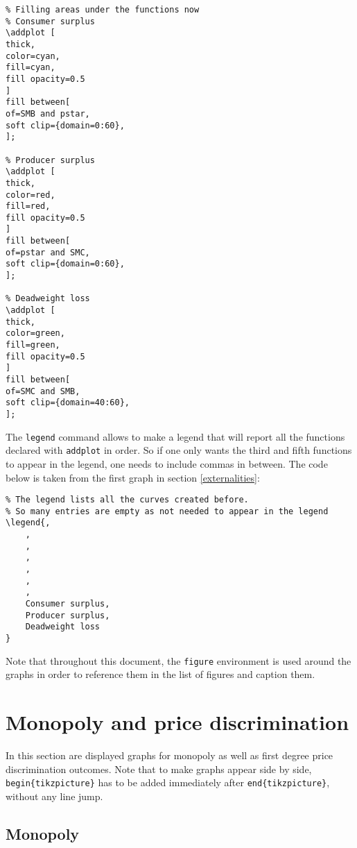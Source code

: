 \documentclass[english]{article}
\begin{document}
\begin{lstlisting}
% Filling areas under the functions now
% Consumer surplus
\addplot [
thick,
color=cyan,
fill=cyan, 
fill opacity=0.5
]
fill between[
of=SMB and pstar,
soft clip={domain=0:60},
];

% Producer surplus
\addplot [
thick,
color=red,
fill=red, 
fill opacity=0.5
]
fill between[
of=pstar and SMC,
soft clip={domain=0:60},
];

% Deadweight loss
\addplot [
thick,
color=green,
fill=green, 
fill opacity=0.5
]
fill between[
of=SMC and SMB,
soft clip={domain=40:60},
];
\end{lstlisting}


The \texttt{legend} command allows to make a legend that will report all the functions declared with \texttt{addplot} in order. So if one only wants the third and fifth functions to appear in the legend, one needs to include commas in between. The code below is taken from the first graph in section \ref{externalities}:

\begin{lstlisting}
% The legend lists all the curves created before. 
% So many entries are empty as not needed to appear in the legend
\legend{,
	,
	,
	,
	,
	,
	,
	Consumer surplus,
	Producer surplus,
	Deadweight loss
}
\end{lstlisting}


Note that throughout this document, the \texttt{figure} environment is used around the graphs in order to reference them in the list of figures and caption them.

\section{Monopoly and price discrimination}
In this section are displayed graphs for monopoly as well as first degree price discrimination outcomes. Note that to make graphs appear side by side, \texttt{begin\{tikzpicture\}} has to be added immediately after \texttt{end\{tikzpicture\}}, without any line jump.

\subsection{Monopoly}	

%	
\end{document}

